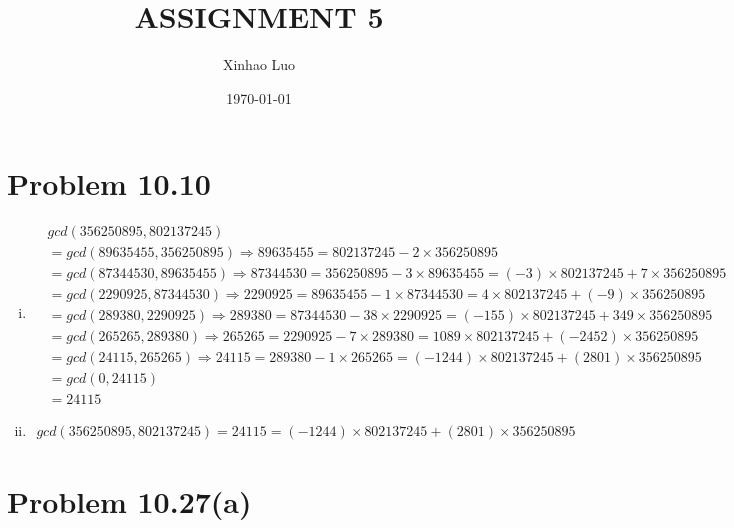 \documentclass{article}
\title{\bf \Large ASSIGNMENT 5}
\author{Xinhao Luo}
\date{\today}
\begin{document}
\maketitle
\medskip

\section{Problem 10.10}
\begin{enumerate}[i)]
    \item \begin{equation}
            \begin{split}
                & gcd(356250895, 802137245) \\
                &= gcd(89635455, 356250895) \Rightarrow 89635455 = 802137245 - 2 \times 356250895 \\
                &= gcd(87344530, 89635455) \Rightarrow 87344530 = 356250895 - 3 \times 89635455 = (-3) \times 802137245 + 7 \times 356250895\\
                &= gcd(2290925, 87344530) \Rightarrow  2290925 = 89635455 - 1 \times 87344530 = 4 \times 802137245 + (-9) \times 356250895\\
                &= gcd(289380, 2290925) \Rightarrow  289380 = 87344530 - 38 \times 2290925 = (-155) \times 802137245 + 349 \times 356250895 \\
                &= gcd(265265, 289380) \Rightarrow 265265 = 2290925 - 7 \times 289380 = 1089 \times 802137245 + (-2452) \times 356250895\\
                &= gcd(24115, 265265) \Rightarrow 24115 = 289380 - 1 \times 265265 = (-1244) \times 802137245 + (2801) \times 356250895\\
                &= gcd(0, 24115) \\
                &= 24115
            \end{split}
    \end{equation}
    \item 
        \begin{equation}
            \begin{split}
                gcd(356250895, 802137245) = 24115 = (-1244) \times 802137245 + (2801) \times 356250895
            \end{split}
        \end{equation}
\end{enumerate}


\section{Problem 10.27(a)}
\end{document}
